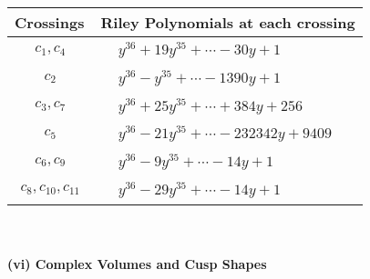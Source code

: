 \documentclass[1p]{elsarticle_modified}
\theoremstyle{definition}
\begin{document}
\begin{tabular}{m{50pt}|m{274pt}}
Crossings & \hspace{64pt}Riley Polynomials at each crossing \\
\hline $$\begin{aligned}c_{1},c_{4}\end{aligned}$$&$\begin{aligned}
&y^{36}+19 y^{35}+\cdots-30 y+1
\end{aligned}$\\
\hline $$\begin{aligned}c_{2}\end{aligned}$$&$\begin{aligned}
&y^{36}- y^{35}+\cdots-1390 y+1
\end{aligned}$\\
\hline $$\begin{aligned}c_{3},c_{7}\end{aligned}$$&$\begin{aligned}
&y^{36}+25 y^{35}+\cdots+384 y+256
\end{aligned}$\\
\hline $$\begin{aligned}c_{5}\end{aligned}$$&$\begin{aligned}
&y^{36}-21 y^{35}+\cdots-232342 y+9409
\end{aligned}$\\
\hline $$\begin{aligned}c_{6},c_{9}\end{aligned}$$&$\begin{aligned}
&y^{36}-9 y^{35}+\cdots-14 y+1
\end{aligned}$\\
\hline $$\begin{aligned}c_{8},c_{10},c_{11}\end{aligned}$$&$\begin{aligned}
&y^{36}-29 y^{35}+\cdots-14 y+1
\end{aligned}$\\
\hline
\end{tabular}\\~\\
\newpage\flushleft \textbf{(vi) Complex Volumes and Cusp Shapes}
\end{document}
